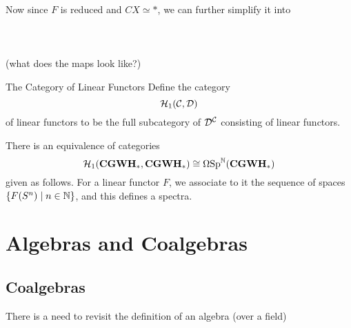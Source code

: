 \documentclass[a4paper]{article}
\begin{document}
Now since $F$ is reduced and $CX\simeq\ast$, we can further simplify it into \\~\\
\\~\\ 
(what does the maps look like?)





\begin{defn}{The Category of Linear Functors}{} Define the category $$\mathcal{H}_1(\mathcal{C},\mathcal{D})$$ of linear functors to be the full subcategory of $\mathcal{D}^{\mathcal{C}}$ consisting of linear functors. 
\end{defn}

\begin{thm}{}{} There is an equivalence of categories $$\mathcal{H}_1(\bold{CGWH}_\ast,\bold{CGWH}_\ast)\cong\Omega\text{Sp}^{\mathbb{N}}(\bold{CGWH}_\ast)$$ given as follows. For a linear functor $F$, we associate to it the sequence of spaces $\{F(S^n)\;|\;n\in\mathbb{N}\}$, and this defines a spectra. 
\end{thm}

\pagebreak
\section{Algebras and Coalgebras}
\subsection{Coalgebras}
There is a need to revisit the definition of an algebra (over a field)
\end{document}
